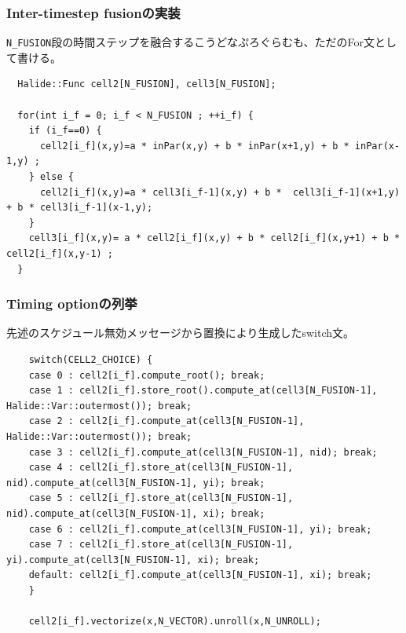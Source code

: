 \documentclass[dvipdfmx,cjk]{beamer}
\begin{document}
\begin{frame}[fragile]\frametitle{Inter-timestep fusionの実装}

{\tt N\_FUSION}段の時間ステップを融合するこうどなぷろぐらむも、ただのFor文として書ける。

\begingroup \fontsize{8pt}{9pt}\selectfont
\begin{verbatim}
  Halide::Func cell2[N_FUSION], cell3[N_FUSION];

  for(int i_f = 0; i_f < N_FUSION ; ++i_f) {
    if (i_f==0) {
      cell2[i_f](x,y)=a * inPar(x,y) + b * inPar(x+1,y) + b * inPar(x-1,y) ;
    } else {
      cell2[i_f](x,y)=a * cell3[i_f-1](x,y) + b *  cell3[i_f-1](x+1,y) + b * cell3[i_f-1](x-1,y);
    }
    cell3[i_f](x,y)= a * cell2[i_f](x,y) + b * cell2[i_f](x,y+1) + b * cell2[i_f](x,y-1) ;
  }
\end{verbatim}
\endgroup
\end{frame}



\begin{frame}[fragile]\frametitle{Timing optionの列挙}

先述のスケジュール無効メッセージから置換により生成したswitch文。

\begingroup \fontsize{8pt}{9pt}\selectfont
\begin{verbatim}
    switch(CELL2_CHOICE) {
    case 0 : cell2[i_f].compute_root(); break; 
    case 1 : cell2[i_f].store_root().compute_at(cell3[N_FUSION-1], Halide::Var::outermost()); break; 
    case 2 : cell2[i_f].compute_at(cell3[N_FUSION-1], Halide::Var::outermost()); break; 
    case 3 : cell2[i_f].compute_at(cell3[N_FUSION-1], nid); break; 
    case 4 : cell2[i_f].store_at(cell3[N_FUSION-1], nid).compute_at(cell3[N_FUSION-1], yi); break; 
    case 5 : cell2[i_f].store_at(cell3[N_FUSION-1], nid).compute_at(cell3[N_FUSION-1], xi); break; 
    case 6 : cell2[i_f].compute_at(cell3[N_FUSION-1], yi); break; 
    case 7 : cell2[i_f].store_at(cell3[N_FUSION-1], yi).compute_at(cell3[N_FUSION-1], xi); break; 
    default: cell2[i_f].compute_at(cell3[N_FUSION-1], xi); break; 
    }

    cell2[i_f].vectorize(x,N_VECTOR).unroll(x,N_UNROLL);
\end{verbatim}
\endgroup
\end{frame}
\end{document}

